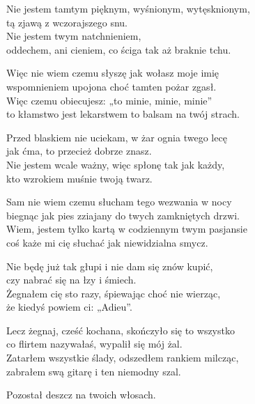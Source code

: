 \begin{text}
    \small{
    Nie jestem tamtym pięknym, wyśnionym, wytęsknionym,\\
    tą zjawą z wczorajszego snu.\\
    Nie jestem twym natchnieniem,\\
    oddechem, ani cieniem, co ściga tak aż braknie tchu.

    Więc nie wiem czemu słyszę jak wołasz moje imię\\
    wspomnieniem upojona choć tamten pożar zgasł.\\
    Więc czemu obiecujesz: „to minie, minie, minie”\\
    to kłamstwo jest lekarstwem to balsam na twój strach.

    Przed blaskiem nie uciekam, w żar ognia twego lecę\\
    jak ćma, to przecież dobrze znasz.\\
    Nie jestem wcale ważny, więc spłonę tak jak każdy,\\
    kto wzrokiem muśnie twoją twarz.

    Sam nie wiem czemu słucham tego wezwania w nocy\\
    biegnąc jak pies zziajany do twych zamkniętych drzwi.\\
    Wiem, jestem tylko kartą w codziennym twym pasjansie\\
    coś każe mi cię słuchać jak niewidzialna smycz.

    Nie będę już tak głupi i nie dam się znów kupić,\\
    czy nabrać się na łzy i śmiech.\\
    Żegnałem cię sto razy, śpiewając choć nie wierząc,\\
    że kiedyś powiem ci: „Adieu”.

    Lecz żegnaj, cześć kochana, skończyło się to wszystko\\
    co flirtem nazywałaś, wypalił się mój żal.\\
    Zatarłem wszystkie ślady, odszedłem rankiem milcząc,\\
    zabrałem swą gitarę i ten niemodny szal.

    Pozostał deszcz na twoich włosach.
    }
\end{text}
\begin{chord}

\end{chord}